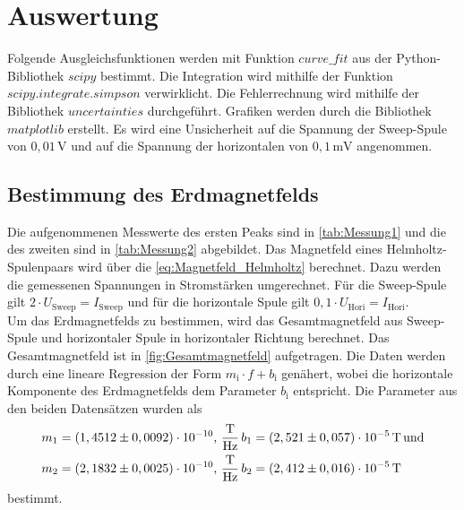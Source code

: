 \section{Auswertung}
\label{sec:auswertung}

Folgende Ausgleichsfunktionen werden mit Funktion $curve\_fit$ aus der Python\cite{py}-Bibliothek $scipy$\cite{2020SciPy-NMeth} bestimmt.
Die Integration wird mithilfe der Funktion $scipy.integrate.simpson$ \cite{2020SciPy-NMeth}verwirklicht.
Die Fehlerrechnung wird mithilfe der Bibliothek $uncertainties$ \cite{unp} durchgeführt.
Grafiken werden durch die Bibliothek $matplotlib$\cite{Hunter:2007} erstellt. 
Es wird eine Unsicherheit auf die Spannung der Sweep-Spule von $0,01 \, \unit{\volt}$ und auf die Spannung der horizontalen von $0,1 \, \unit{\milli\volt} $ angenommen.

\subsection{Bestimmung des Erdmagnetfelds}

Die aufgenommenen Messwerte des ersten Peaks sind in \autoref{tab:Messung1} und die des zweiten sind in \autoref{tab:Messung2} abgebildet.
Das Magnetfeld eines Helmholtz-Spulenpaars wird über die \eqref{eq:Magnetfeld_Helmholtz} berechnet.
Dazu werden die gemessenen Spannungen in Stromstärken umgerechnet.
Für die Sweep-Spule gilt $2 \cdot U_\text{Sweep} = I_\text{Sweep}$ und für die horizontale Spule gilt $0,1 \cdot U_\text{Hori} = I_\text{Hori}$.\\
Um das Erdmagnetfelds zu bestimmen, wird das Gesamtmagnetfeld aus Sweep-Spule und horizontaler Spule in horizontaler Richtung berechnet.
Das Gesamtmagnetfeld ist in \autoref{fig:Gesamtmagnetfeld} aufgetragen. 
Die Daten werden durch eine lineare Regression der Form $m_\text{i} \cdot f + b_\text{i}$ genähert,
wobei die horizontale Komponente des Erdmagnetfelds dem Parameter $b_\text{i}$ entspricht.
Die Parameter aus den beiden Datensätzen wurden als 
\begin{align*}
    &m_1 =   \left( 1,4512 \pm 0,0092 \right) \cdot 10^{-10},\, \unit{\dfrac{\tesla}{\hertz}} \, b_1 = \left( 2,521  \pm 0,057 \right) \cdot 10^{-5}\, \unit{\tesla} \, \text{und} \\
    &m_2 =   \left( 2,1832 \pm 0,0025 \right) \cdot 10^{-10},\, \unit{\dfrac{\tesla}{\hertz}} \, b_2 = \left( 2,412  \pm 0,016 \right) \cdot 10^{-5}\, \unit{\tesla} \\
\end{align*}
bestimmt.



